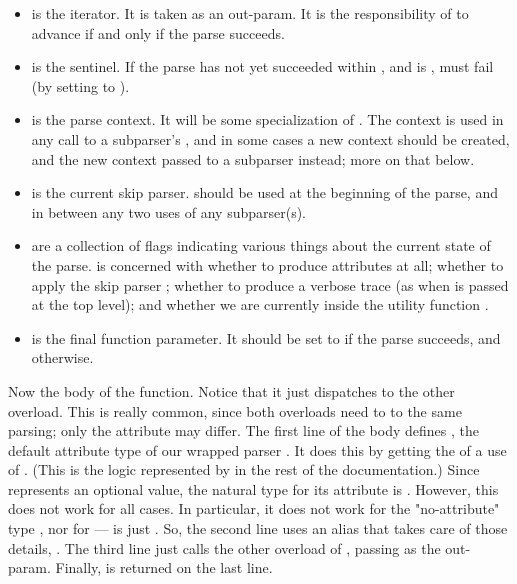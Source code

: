 \documentclass{MyBook}
\begin{document}
\begin{itemize}
\item
   is the iterator. It is taken as an out-param. It is the responsibility of  to advance  if and only if the parse succeeds.
\item
   is the sentinel. If the parse has not yet succeeded within , and  is ,  must fail (by setting  to ).
\item
   is the parse context. It will be some specialization of . The context is used in any call to a subparser's , and in some cases a new context should be created, and the new context passed to a subparser instead; more on that below.
\item
   is the current skip parser.  should be used at the beginning of the parse, and in between any two uses of any subparser(s).
\item
   are a collection of flags indicating various things about the current state of the parse.  is concerned with whether to produce attributes at all; whether to apply the skip parser ; whether to produce a verbose trace (as when  is passed at the top level); and whether we are currently inside the utility function .
\item
   is the final function parameter. It should be set to  if the parse succeeds, and  otherwise.
\end{itemize}

Now the body of the function. Notice that it just dispatches to the other  overload. This is really common, since both overloads need to to the same parsing; only the attribute may differ. The first line of the body defines , the default attribute type of our wrapped parser . It does this by getting the  of a use of . (This is the logic represented by \emph{}\ci{()} in the rest of the documentation.) Since  represents an optional value, the natural type for its attribute is \emph{}. However, this does not work for all cases. In particular, it does not work for the "no-attribute" type , nor for  --- \emph{} is just \emph{}. So, the second line uses an alias that takes care of those details, . The third line just calls the other overload of , passing  as the out-param. Finally,  is returned on the last line.
\end{document}

